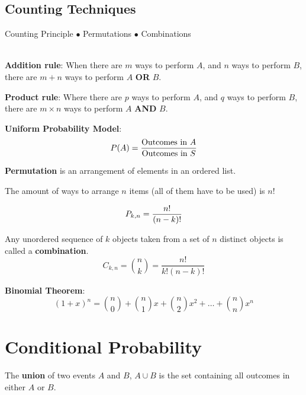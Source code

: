 \documentclass[english, 12pt]{article}
\begin{document}
\subsection{Counting Techniques}
Counting Principle $\bullet$ Permutations $\bullet$ Combinations\\\\

\begin{defn}
\textbf{Addition rule}: When there are $m$ ways to perform $A$, and $n$ ways to perform $B$, there are $m+n$ ways to perform $A$ \textbf{OR} $B$.
\end{defn}

\begin{defn}
\textbf{Product rule}: Where there are $p$ ways to perform $A$, and $q$ ways to perform $B$, there are $m \times n$ ways to perform $A$ \textbf{AND} $B$.
\end{defn}

\begin{defn}
\textbf{Uniform Probability Model}:
\[P(A) = \frac{\text{Outcomes in } A}{\text{Outcomes in } S} \]
\end{defn}

\begin{defn}
\textbf{Permutation} is an arrangement of elements in an ordered list.
\begin{note}
The amount of ways to arrange $n$ items (all of them have to be used) is $n!$
\end{note}
\[P_{k,n} = \frac{n!}{(n-k)!}\]
\end{defn}

\begin{defn}
Any unordered sequence of $k$ objects taken from a set of $n$ distinct objects is called a \textbf{combination}.
\[C_{k,n} = \binom{n}{k} = \frac{n!}{k! (n-k)!}\]
\end{defn}

\begin{exmp}
\textbf{Binomial Theorem}:
\[(1+x)^n = \binom{n}{0} + \binom{n}{1} x + \binom{n}{2} x^2 + \dots + \binom{n}{n} x^n\]
\end{exmp}

\section{Conditional Probability}

\begin{defn}
The \textbf{union} of two events $A$ and $B$, $A \cup B$ is the set containing all outcomes in either $A$ or $B$.
\end{defn}
\end{document}
